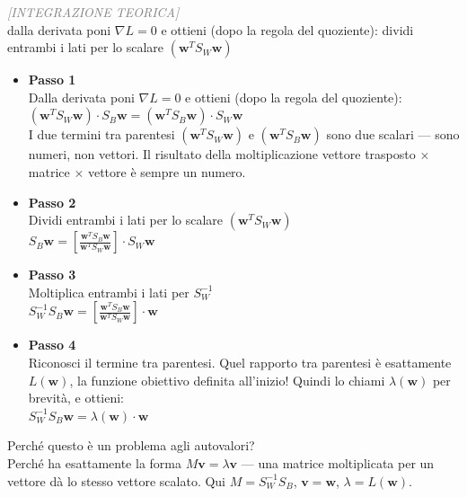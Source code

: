\begin{tcolorbox}[colframe=blue!70!black, colback=white, sharp corners=southwest, left=2mm, boxrule=1pt, enhanced, breakable]
\textcolor{gray}{\footnotesize\textit{[INTEGRAZIONE TEORICA]}}\\
dalla derivata poni $\nabla L = 0$ e ottieni (dopo la regola del quoziente):
dividi entrambi i lati per lo scalare $(\mathbf{w}^T S_W \mathbf{w})$
\begin{itemize}
	\item \textbf{Passo 1} \\ 
	Dalla derivata poni $\nabla L = 0$ e ottieni (dopo la regola del quoziente): \\ 
	$(\mathbf{w}^T S_W \mathbf{w}) \cdot S_B \mathbf{w} = (\mathbf{w}^T S_B \mathbf{w}) \cdot S_W \mathbf{w}$ \\ 
	I due termini tra parentesi $(\mathbf{w}^T S_W \mathbf{w})$ e $(\mathbf{w}^T S_B \mathbf{w})$ sono due scalari — sono numeri, non vettori. Il risultato della moltiplicazione vettore trasposto × matrice × vettore è sempre un numero.

	\vspace{0.5em}
	\item \textbf{Passo 2} \\ 
	Dividi entrambi i lati per lo scalare $(\mathbf{w}^T S_W \mathbf{w})$ \\ 
	$S_B \mathbf{w} = \left[\frac{\mathbf{w}^T S_B \mathbf{w}}{\mathbf{w}^T S_W \mathbf{w}}\right] \cdot S_W \mathbf{w}$

	\vspace{0.5em}
	\item \textbf{Passo 3} \\ 
	Moltiplica entrambi i lati per $S_W^{-1}$ \\ 
	$S_W^{-1} S_B \mathbf{w} = \left[\frac{\mathbf{w}^T S_B \mathbf{w}}{\mathbf{w}^T S_W \mathbf{w}}\right] \cdot \mathbf{w}$

	\vspace{0.5em}
	\item \textbf{Passo 4} \\ 
	Riconosci il termine tra parentesi. Quel rapporto tra parentesi è esattamente $L(\mathbf{w})$, la funzione obiettivo definita all'inizio! Quindi lo chiami $\lambda(\mathbf{w})$ per brevità, e ottieni: \\ 
	$S_W^{-1} S_B \mathbf{w} = \lambda(\mathbf{w}) \cdot \mathbf{w}$
\end{itemize}

\vspace{0.5em}
Perché questo è un problema agli autovalori? \\ 
Perché ha esattamente la forma $M \mathbf{v} = \lambda \mathbf{v}$ — una matrice moltiplicata per un vettore dà lo stesso vettore scalato. Qui $M = S_W^{-1} S_B$, $\mathbf{v} = \mathbf{w}$, $\lambda = L(\mathbf{w})$.


\end{tcolorbox}
